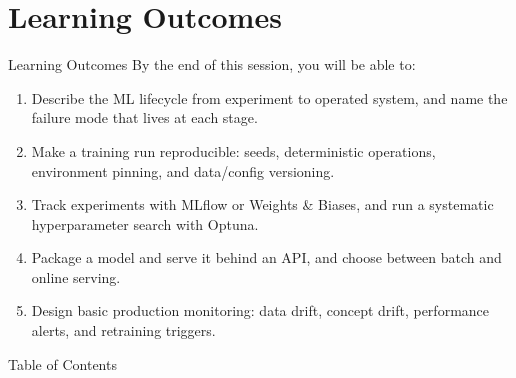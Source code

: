 \section{Learning Outcomes}

\begin{frame}{Learning Outcomes}
    By the end of this session, you will be able to:

    \vspace{0.5em}
    \begin{enumerate}
        \item Describe the ML lifecycle from experiment to operated system, and name the failure mode that lives at each stage.

        \item Make a training run reproducible: seeds, deterministic operations, environment pinning, and data/config versioning.

        \item Track experiments with MLflow or Weights \& Biases, and run a systematic hyperparameter search with Optuna.

        \item Package a model and serve it behind an API, and choose between batch and online serving.

        \item Design basic production monitoring: data drift, concept drift, performance alerts, and retraining triggers.
    \end{enumerate}
\end{frame}

\begin{frame}[allowframebreaks]{Table of Contents}
    \tableofcontents
\end{frame}
